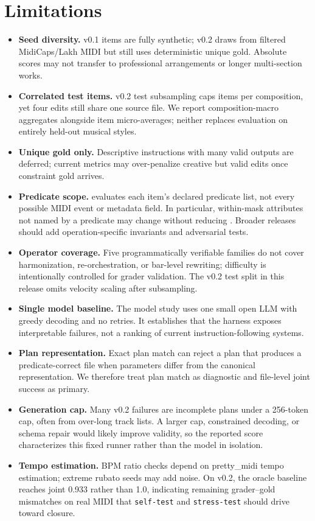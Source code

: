 \section{Limitations}

\begin{itemize}[leftmargin=*]
\item \textbf{Seed diversity.} v0.1 items are fully synthetic; v0.2 draws from filtered MidiCaps/Lakh MIDI but still uses deterministic unique gold. Absolute scores may not transfer to professional arrangements or longer multi-section works.
\item \textbf{Correlated test items.} v0.2 test subsampling caps items per composition, yet four edits still share one source file. We report composition-macro aggregates alongside item micro-averages; neither replaces evaluation on entirely held-out musical styles.
\item \textbf{Unique gold only.} Descriptive instructions with many valid outputs are deferred; current metrics may over-penalize creative but valid edits once constraint gold arrives.
\item \textbf{Predicate scope.} \preserve{} evaluates each item's declared predicate list, not every possible MIDI event or metadata field. In particular, within-mask attributes not named by a predicate may change without reducing \preserve{}. Broader releases should add operation-specific invariants and adversarial tests.
\item \textbf{Operator coverage.} Five programmatically verifiable families do not cover harmonization, re-orchestration, or bar-level rewriting; difficulty is intentionally controlled for grader validation. The v0.2 test split in this release omits velocity scaling after subsampling.
\item \textbf{Single model baseline.} The model study uses one small open LLM with greedy decoding and no retries. It establishes that the harness exposes interpretable failures, not a ranking of current instruction-following systems.
\item \textbf{Plan representation.} Exact plan match can reject a plan that produces a predicate-correct file when parameters differ from the canonical representation. We therefore treat plan match as diagnostic and file-level joint success as primary.
\item \textbf{Generation cap.} Many v0.2 failures are incomplete plans under a 256-token cap, often from over-long track lists. A larger cap, constrained decoding, or schema repair would likely improve validity, so the reported score characterizes this fixed runner rather than the model in isolation.
\item \textbf{Tempo estimation.} BPM ratio checks depend on pretty\_midi tempo estimation; extreme rubato seeds may add noise. On v0.2, the oracle baseline reaches joint 0.933 rather than 1.0, indicating remaining grader--gold mismatches on real MIDI that \texttt{self-test} and \texttt{stress-test} should drive toward closure.
\end{itemize}
